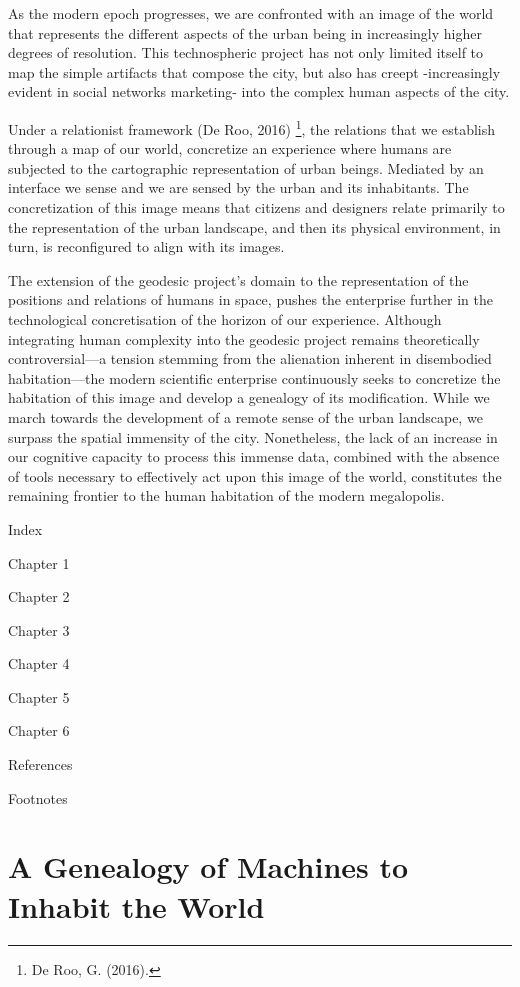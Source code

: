 \documentclass[
  letterpaper,
  DIV=11,
  numbers=noendperiod]{scrreprt}
\begin{document}
As the modern epoch progresses, we are confronted with an image of the
world that represents the different aspects of the urban being in
increasingly higher degrees of resolution. This technospheric project
has not only limited itself to map the simple artifacts that compose the
city, but also has creept -increasingly evident in social networks
marketing- into the complex human aspects of the city.

Under a relationist framework (De Roo, 2016) \footnote{De Roo, G.
  (2016).}, the relations that we establish through a map of our world,
concretize an experience where humans are subjected to the cartographic
representation of urban beings. Mediated by an interface we sense and we
are sensed by the urban and its inhabitants. The concretization of this
image means that citizens and designers relate primarily to the
representation of the urban landscape, and then its physical
environment, in turn, is reconfigured to align with its images.

The extension of the geodesic project's domain to the representation of
the positions and relations of humans in space, pushes the enterprise
further in the technological concretisation of the horizon of our
experience. Although integrating human complexity into the geodesic
project remains theoretically controversial---a tension stemming from
the alienation inherent in disembodied habitation---the modern
scientific enterprise continuously seeks to concretize the habitation of
this image and develop a genealogy of its modification. While we march
towards the development of a remote sense of the urban landscape, we
surpass the spatial immensity of the city. Nonetheless, the lack of an
increase in our cognitive capacity to process this immense data,
combined with the absence of tools necessary to effectively act upon
this image of the world, constitutes the remaining frontier to the human
habitation of the modern megalopolis.

Index

Chapter 1

Chapter 2

Chapter 3

Chapter 4

Chapter 5

Chapter 6

References

Footnotes


\chapter{A Genealogy of Machines to Inhabit the
World}\label{a-genealogy-of-machines-to-inhabit-the-world}
\end{document}
